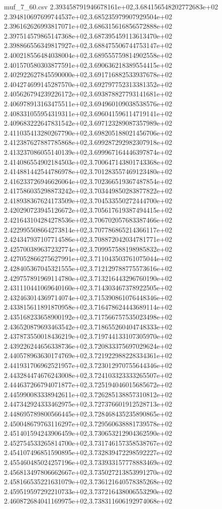 \begin{filecontents*}{muf_7_60.csv}
2.393458791946678161e+02,3.684156548202772683e+02
2.394810697699744537e+02,3.685235979907929504e+02
2.396162626993817071e+02,3.686315616856572888e+02
2.397514579865147368e+02,3.687395459113613470e+02
2.398866556349817927e+02,3.688475506744753147e+02
2.400218556484038004e+02,3.689555759814902558e+02
2.401570580303877591e+02,3.690636218389554415e+02
2.402922627845590000e+02,3.691716882533937678e+02
2.404274699145287570e+02,3.692797752313381352e+02
2.405626794239226172e+02,3.693878827793141681e+02
2.406978913163475511e+02,3.694960109038538576e+02
2.408331055954319311e+02,3.696041596114719141e+02
2.409683222647831542e+02,3.697123289087357989e+02
2.411035413280267790e+02,3.698205188021456706e+02
2.412387627887785868e+02,3.699287292982307918e+02
2.413237086055140139e+02,3.699967164446397874e+02
2.414086554902184503e+02,3.700647143801743368e+02
2.414881442544786978e+02,3.701283557469123480e+02
2.416233726946626064e+02,3.702366519367487854e+02
2.417586035298873242e+02,3.703449850283877822e+02
2.418938367624173509e+02,3.704533550272444700e+02
2.420290723945126672e+02,3.705617619387494415e+02
2.421643104284278536e+02,3.706702057683387466e+02
2.422995508664273814e+02,3.707786865214366117e+02
2.424347937107714586e+02,3.708872042034781771e+02
2.425700389637232774e+02,3.709957588198985832e+02
2.427052866275627991e+02,3.711043503761075044e+02
2.428405367045321555e+02,3.712129788775573616e+02
2.429757891969114780e+02,3.713216443296760190e+02
2.431110441069640160e+02,3.714303467378922505e+02
2.432463014369714074e+02,3.715390861076448346e+02
2.433815611891870958e+02,3.716478624443689114e+02
2.435168233658900192e+02,3.717566757535023498e+02
2.436520879693463542e+02,3.718655260404748333e+02
2.437873550018436219e+02,3.719744133107305970e+02
2.439226244656338736e+02,3.720833375697029624e+02
2.440578963630174769e+02,3.721922988228334361e+02
2.441931706962521957e+02,3.723012970755644346e+02
2.443284474676243008e+02,3.724103323333265507e+02
2.444637266794071877e+02,3.725194046015685672e+02
2.445990083338942611e+02,3.726285138857310812e+02
2.447342924333462975e+02,3.727376601912528713e+02
2.448695789800566445e+02,3.728468435235890865e+02
2.450048679763116297e+02,3.729560638881739578e+02
2.451401594243906459e+02,3.730653212904362590e+02
2.452754533265814700e+02,3.731746157358538767e+02
2.454107496851590895e+02,3.732839472298592227e+02
2.455460485024257196e+02,3.733933157778883469e+02
2.456813497806662667e+02,3.735027213853991270e+02
2.458166535221631079e+02,3.736121640578385268e+02
2.459519597292210733e+02,3.737216438006553290e+02
2.460872684041169975e+02,3.738311606192974068e+02

\end{filecontents*}
